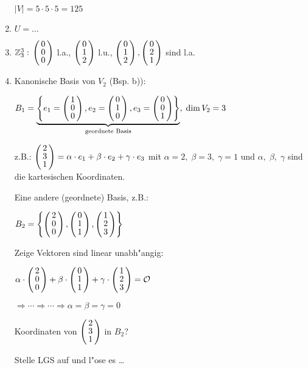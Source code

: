 \begin{enumerate}
	$|V| = 5 \cdot 5 \cdot 5 = 125$
	\item 
	$U = \dots$ %
 
	 \item
	 $\Z_3^3:\\
	 \vct{0 \\ 0 \\ 0}$ l.a., $\vct{0 \\ 1 \\2}$ l.u., $\vct{0 \\ 1 \\ 2}, \vct{0 \\ 2 \\ 1}$ sind l.a.
	 \item
	 Kanonische Basis von $V_2$ (Bsp. b)):
	 
	 $B_1 = \underbrace{\aset{e_1 = \vct{1 \\ 0 \\ 0}, e_2 = \vct{0 \\ 1 \\ 0}, e_3= \vct{0 \\ 0 \\ 1}}}_{\text{geordnete Basis}},\; \dim V_2 = 3$
	 
	 z.B.: $\vct{2 \\ 3 \\ 1}= \alpha \cdot e_1 + \beta \cdot e_2 + \gamma \cdot e_3$ mit $\alpha = 2, \;\beta = 3, \;\gamma =1 $ und $\alpha, \; \beta, \; \gamma $ sind die kartesischen Koordinaten.
	 
	 Eine andere (geordnete) Basis, z.B.:
	 
	 $B_2 = \aset {\vct{2 \\ 0 \\ 0}, \vct{0 \\ 1 \\ 1}, \vct{1 \\2 \\ 3}}$
	 
	 Zeige Vektoren sind linear unabh"angig:
	 
	 $\alpha \cdot \vct{2 \\ 0 \\ 0} + \beta \cdot \vct{0 \\  1\\ 1} + \gamma \cdot \vct{1 \\ 2 \\ 3} = \zerovec$
	 
	 $\Rightarrow  \cdots  \Rightarrow \cdots \Rightarrow \alpha = \beta = \gamma = 0$
	 
	 Koordinaten von $\vct{2 \\ 3 \\ 1}$ in $B_2$?
	 
	 Stelle LGS auf und l"ose es \dots
	 \end{enumerate}
	 
